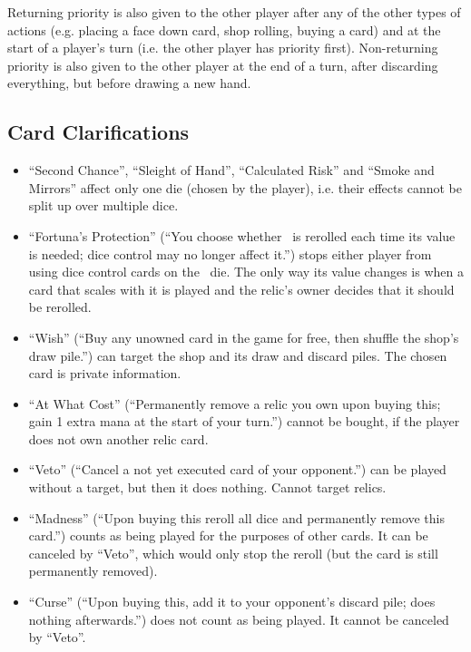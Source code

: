 \documentclass[dvipsnames,parskip,a4paper]{scrartcl}
\newcommand{\iconsize}{3.4mm}
\newcommand{\icondepth}{0.45mm}
\newcommand{\icon}[1]{\raisebox{-\icondepth}{\texttt{[image:  \#1 ]}}}
\newcommand{\chance}{\icon{icons/chance.png}}
\begin{document}
\vspace{4pt}

Returning priority is also given to the other player after any of the other types of actions (e.g. placing a face down card, shop rolling, buying a card) and at the start of a player's turn (i.e. the other player has priority first). Non-returning priority is also given to the other player at the end of a turn, after discarding everything, but before drawing a new hand.

\newpage

\subsection*{Card Clarifications}

\begin{itemize}
\item ``Second Chance'', ``Sleight of Hand'', ``Calculated Risk'' and ``Smoke and Mirrors'' affect only one die (chosen by the player), i.e. their effects cannot be split up over multiple dice.
\item ``Fortuna's Protection'' (``You choose whether \chance \ is rerolled each time its value is needed; dice control may no longer affect it.'') stops either player from using dice control cards on the \chance \ die. The only way its value changes is when a card that scales with it is played and the relic's owner decides that it should be rerolled.
\item ``Wish'' (``Buy any unowned card in the game for free, then shuffle the shop's draw pile.'') can target the shop and its draw and discard piles. The chosen card is private information.
\item ``At What Cost'' (``Permanently remove a relic you own upon buying this; gain 1 extra mana at the start of your turn.'') cannot be bought, if the player does not own another relic card.
\item ``Veto'' (``Cancel a not yet executed card of your opponent.'') can be played without a target, but then it does nothing. Cannot target relics.
\item ``Madness'' (``Upon buying this reroll all dice and permanently remove this card.'') counts as being played for the purposes of other cards. It can be canceled by ``Veto'', which would only stop the reroll (but the card is still permanently removed). 
\item ``Curse'' (``Upon buying this, add it to your opponent's discard pile; does nothing afterwards.'') does not count as being played. It cannot be canceled by ``Veto''.
\end{itemize}
\end{document}
